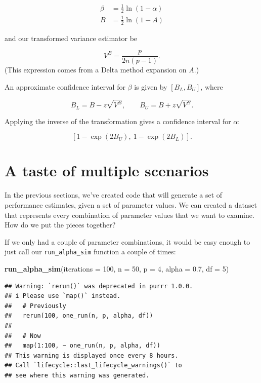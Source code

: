 \documentclass[
]{book}
\newenvironment{Shaded}{\begin{snugshade}}{\end{snugshade}}
\newcommand{\AttributeTok}[1]{\textcolor[rgb]{0.13,0.29,0.53}{#1}}
\newcommand{\DecValTok}[1]{\textcolor[rgb]{0.00,0.00,0.81}{#1}}
\newcommand{\FloatTok}[1]{\textcolor[rgb]{0.00,0.00,0.81}{#1}}
\newcommand{\FunctionTok}[1]{\textcolor[rgb]{0.13,0.29,0.53}{\textbf{#1}}}
\newcommand{\NormalTok}[1]{#1}
\begin{document}
\[
\begin{aligned}
\beta &= \frac{1}{2} \ln\left(1 - \alpha\right) \\
B &= \frac{1}{2} \ln\left(1 - A\right)
\end{aligned}
\]

and our transformed variance estimator be

\[
V^B = \frac{p}{2 n (p - 1)}.
\]
(This expression comes from a Delta method expansion on \(A\).)

An approximate confidence interval for \(\beta\) is given by \([B_L, B_U]\), where

\[
B_L = B - z \sqrt{V^B}, \qquad B_U = B + z \sqrt{V^B}.
\]

Applying the inverse of the transformation gives a confidence interval for \(\alpha\):

\[
\left[1 - \exp(2B_U), \ 1 - \exp(2 B_L)\right].
\]

\section{A taste of multiple scenarios}\label{a-taste-of-multiple-scenarios}

In the previous sections, we've created code that will generate a set of performance estimates, given a set of parameter values. We can created a dataset that represents every combination of parameter values that we want to examine. How do we put the pieces together?

If we only had a couple of parameter combinations, it would be easy enough to just call our \texttt{run\_alpha\_sim} function a couple of times:

\begin{Shaded}
\begin{Highlighting}[]
\FunctionTok{run\_alpha\_sim}\NormalTok{(}\AttributeTok{iterations =} \DecValTok{100}\NormalTok{, }\AttributeTok{n =} \DecValTok{50}\NormalTok{, }\AttributeTok{p =} \DecValTok{4}\NormalTok{, }\AttributeTok{alpha =} \FloatTok{0.7}\NormalTok{, }\AttributeTok{df =} \DecValTok{5}\NormalTok{)}
\end{Highlighting}
\end{Shaded}

\begin{verbatim}
## Warning: `rerun()` was deprecated in purrr 1.0.0.
## i Please use `map()` instead.
##   # Previously
##   rerun(100, one_run(n, p, alpha, df))
## 
##   # Now
##   map(1:100, ~ one_run(n, p, alpha, df))
## This warning is displayed once every 8 hours.
## Call `lifecycle::last_lifecycle_warnings()` to
## see where this warning was generated.
\end{verbatim}
\end{document}
